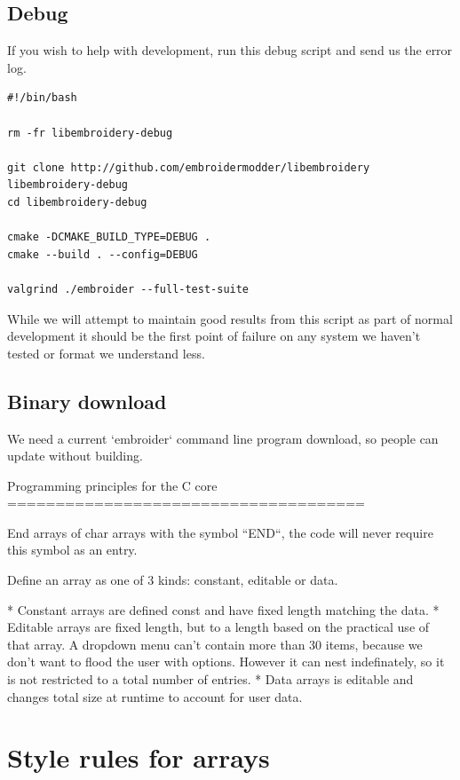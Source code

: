 \documentclass[a4paper]{report}
\begin{document}
\subsection{Debug}

If you wish to help with development, run this debug script and send us the
error log.

\begin{lstlisting}
#!/bin/bash

rm -fr libembroidery-debug

git clone http://github.com/embroidermodder/libembroidery libembroidery-debug
cd libembroidery-debug

cmake -DCMAKE_BUILD_TYPE=DEBUG .
cmake --build . --config=DEBUG

valgrind ./embroider --full-test-suite
\end{lstlisting}

While we will attempt to maintain good results from this script as part of
normal development it should be the first point of failure on any system we
haven't tested or format we understand less.

\subsection{Binary download}

We need a current `embroider` command line program download, so people can update
without building.

Programming principles for the C core
=====================================

End arrays of char arrays with the symbol ``END``, the code will never require
this symbol as an entry.

Define an array as one of 3 kinds: constant, editable or data.

* Constant arrays are defined const and have fixed length matching the data.
* Editable arrays are fixed length, but to a length based on the practical use
  of that array. A dropdown menu can't contain more than 30 items, because we
  don't want to flood the user with options. However it can nest indefinately,
  so it is not restricted to a total number of entries.
* Data arrays is editable and changes total size at runtime to account for user data.

\section{Style rules for arrays}
\end{document}
